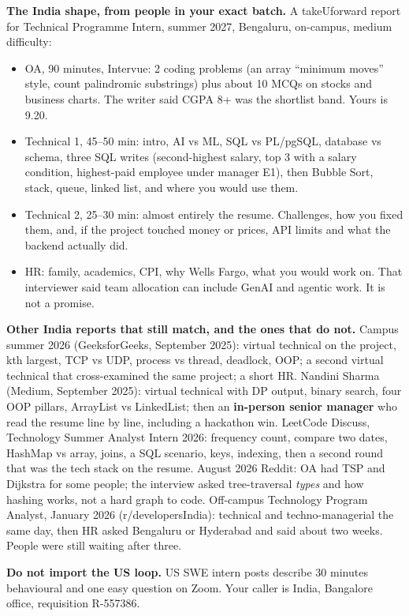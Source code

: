 \documentclass[a4paper,9.5pt]{extarticle}
\begin{document}
\textbf{The India shape, from people in your exact batch.} A takeUforward report for Technical Programme Intern, summer 2027, Bengaluru, on-campus, medium difficulty:
\begin{itemize}
  \item OA, 90 minutes, Intervue: 2 coding problems (an array ``minimum moves'' style, count palindromic substrings) plus about 10 MCQs on stocks and business charts. The writer said CGPA 8+ was the shortlist band. Yours is 9.20.
  \item Technical 1, 45--50 min: intro, AI vs ML, SQL vs PL/pgSQL, database vs schema, three SQL writes (second-highest salary, top 3 with a salary condition, highest-paid employee under manager E1), then Bubble Sort, stack, queue, linked list, and where you would use them.
  \item Technical 2, 25--30 min: almost entirely the resume. Challenges, how you fixed them, and, if the project touched money or prices, API limits and what the backend actually did.
  \item HR: family, academics, CPI, why Wells Fargo, what you would work on. That interviewer said team allocation can include GenAI and agentic work. It is not a promise.
\end{itemize}

\textbf{Other India reports that still match, and the ones that do not.}
Campus summer 2026 (GeeksforGeeks, September 2025): virtual technical on the project, kth largest, TCP vs UDP, process vs thread, deadlock, OOP; a second virtual technical that cross-examined the same project; a short HR. Nandini Sharma (Medium, September 2025): virtual technical with DP output, binary search, four OOP pillars, ArrayList vs LinkedList; then an \textbf{in-person senior manager} who read the resume line by line, including a hackathon win. LeetCode Discuss, Technology Summer Analyst Intern 2026: frequency count, compare two dates, HashMap vs array, joins, a SQL scenario, keys, indexing, then a second round that was the tech stack on the resume. August 2026 Reddit: OA had TSP and Dijkstra for some people; the interview asked tree-traversal \emph{types} and how hashing works, not a hard graph to code. Off-campus Technology Program Analyst, January 2026 (r/developersIndia): technical and techno-managerial the same day, then HR asked Bengaluru or Hyderabad and said about two weeks. People were still waiting after three.

\textbf{Do not import the US loop.} US SWE intern posts describe 30 minutes behavioural and one easy question on Zoom. Your caller is India, Bangalore office, requisition R-557386.
\end{document}
